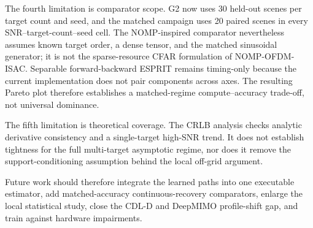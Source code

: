 The fourth limitation is comparator scope. G2 now uses 30 held-out scenes per target count and seed, and the matched campaign uses 20 paired scenes in every SNR--target-count--seed cell. The NOMP-inspired comparator nevertheless assumes known target order, a dense tensor, and the matched sinusoidal generator; it is not the sparse-resource CFAR formulation of NOMP-OFDM-ISAC. Separable forward-backward ESPRIT remains timing-only because the current implementation does not pair components across axes. The resulting Pareto plot therefore establishes a matched-regime compute--accuracy trade-off, not universal dominance.

The fifth limitation is theoretical coverage. The CRLB analysis checks analytic derivative consistency and a single-target high-SNR trend. It does not establish tightness for the full multi-target asymptotic regime, nor does it remove the support-conditioning assumption behind the local off-grid argument.

Future work should therefore integrate the learned paths into one executable estimator, add matched-accuracy continuous-recovery comparators, enlarge the local statistical study, close the CDL-D and DeepMIMO profile-shift gap, and train against hardware impairments.
